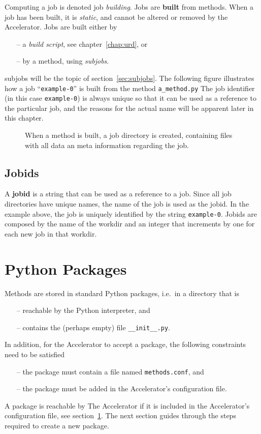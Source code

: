 Computing a job is denoted job \textsl{building}.
Jobs are \textbf{built} from methods.  When a job has been built, it
is \textsl{static}, and cannot be altered or removed by the
Accelerator.  Jobs are built either by
\begin{itemize}
\item[--] a \textsl{build script}, see chapter~\ref{chap:urd}, or
\item[--] by a method, using \textsl{subjobs}.
\end{itemize}
subjobs will be the topic of section~\ref{sec:subjobs}.  The following
figure illustrates how a job ``\texttt{example-0}'' is built from the
method \texttt{a\_method.py}
The job identifier (in this case \texttt{example-0}) is always unique
so that it can be used as a reference to the particular job, and the
reasons for the actual name will be apparent later in this chapter.
\begin{figure}[h!]
  \begin{center}
    
    \label{fig:method}
  \end{center}
  \caption{When a method is built, a job directory is created,
    containing files with all data an meta information regarding the
    job.}
\end{figure}



\subsection{Jobids}
A \textbf{jobid} is a string that can be used as a reference to a job.
Since all job directories have unique names, the name of the job is
used as the jobid.  In the example above, the job is uniquely
identified by the string \texttt{example-0}.  Jobids are composed by
the name of the workdir and an integer that increments by one for each
new job in that workdir.



\section{Python Packages}
Methods are stored in standard Python packages, i.e.\ in a directory that is
\begin{itemize}
\item[--] reachable by the Python interpreter, and
\item[--] contains the (perhaps empty) file \texttt{\_\_init\_\_.py}.
\end{itemize}
In addition, for the Accelerator to accept a package, the following
constraints need to be satisfied
\begin{itemize}
\item[--] the package must contain a file named \texttt{methods.conf}, and
\item[--] the package must be added in the Accelerator's configuration file.
\end{itemize}
A package is reachable by The Accelerator if it is included in the
Accelerator's configuration file, see section~\ref{}.  The next
section guides through the steps required to create a new package.



